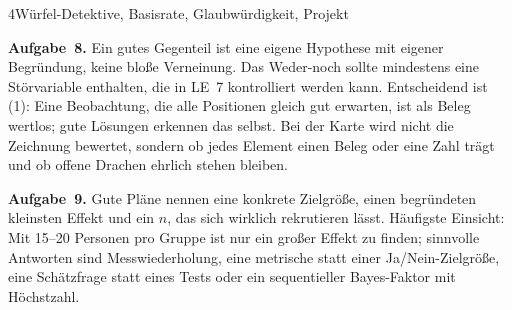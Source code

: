 \begin{uebungsblattb}{4}{Würfel-Detektive, Basisrate, Glaubwürdigkeit, Projekt}
\begin{lehrhinweis}[Erwartungshorizont]
\textbf{Aufgabe~8.} Ein gutes Gegenteil ist eine eigene Hypothese mit
eigener Begründung, keine bloße Verneinung. Das Weder-noch sollte
mindestens eine Störvariable enthalten, die in LE~7 kontrolliert werden
kann. Entscheidend ist (1): Eine Beobachtung, die alle Positionen gleich
gut erwarten, ist als Beleg wertlos; gute Lösungen erkennen das selbst.
Bei der Karte wird nicht die Zeichnung bewertet, sondern ob jedes
Element einen Beleg oder eine Zahl trägt und ob offene Drachen ehrlich
stehen bleiben.

\textbf{Aufgabe~9.} Gute Pläne nennen eine konkrete Zielgröße, einen
begründeten kleinsten Effekt und ein $n$, das sich wirklich rekrutieren
lässt. Häufigste Einsicht: Mit 15--20 Personen pro Gruppe ist nur ein
großer Effekt zu finden; sinnvolle Antworten sind Messwiederholung, eine
metrische statt einer Ja/Nein-Zielgröße, eine Schätzfrage statt eines
Tests oder ein sequentieller Bayes-Faktor mit Höchstzahl.
\end{lehrhinweis}
\end{uebungsblattb}

